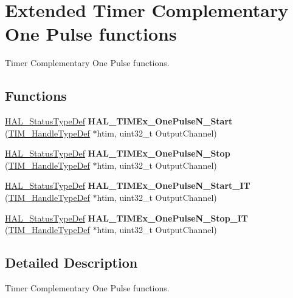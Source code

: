 \hypertarget{group___t_i_m_ex___exported___functions___group4}{}\section{Extended Timer Complementary One Pulse functions}
\label{group___t_i_m_ex___exported___functions___group4}


Timer Complementary One Pulse functions.  


\subsection*{Functions}
\begin{DoxyCompactItemize}
\item 
\mbox{\label{group___t_i_m_ex___exported___functions___group4_ga41e254708b0215a68acb6e0836d4f8ca}} 
\mbox{\hyperlink{stm32f7xx__hal__def_8h_a63c0679d1cb8b8c684fbb0632743478f}{H\+A\+L\+\_\+\+Status\+Type\+Def}} {\bfseries H\+A\+L\+\_\+\+T\+I\+M\+Ex\+\_\+\+One\+Pulse\+N\+\_\+\+Start} (\mbox{\hyperlink{struct_t_i_m___handle_type_def}{T\+I\+M\+\_\+\+Handle\+Type\+Def}} $\ast$htim, uint32\+\_\+t Output\+Channel)
\item 
\mbox{\label{group___t_i_m_ex___exported___functions___group4_gaf42ab805f75ecece735d600e54cabf83}} 
\mbox{\hyperlink{stm32f7xx__hal__def_8h_a63c0679d1cb8b8c684fbb0632743478f}{H\+A\+L\+\_\+\+Status\+Type\+Def}} {\bfseries H\+A\+L\+\_\+\+T\+I\+M\+Ex\+\_\+\+One\+Pulse\+N\+\_\+\+Stop} (\mbox{\hyperlink{struct_t_i_m___handle_type_def}{T\+I\+M\+\_\+\+Handle\+Type\+Def}} $\ast$htim, uint32\+\_\+t Output\+Channel)
\item 
\mbox{\label{group___t_i_m_ex___exported___functions___group4_ga297a97004076cee5734510a0dece7665}} 
\mbox{\hyperlink{stm32f7xx__hal__def_8h_a63c0679d1cb8b8c684fbb0632743478f}{H\+A\+L\+\_\+\+Status\+Type\+Def}} {\bfseries H\+A\+L\+\_\+\+T\+I\+M\+Ex\+\_\+\+One\+Pulse\+N\+\_\+\+Start\+\_\+\+IT} (\mbox{\hyperlink{struct_t_i_m___handle_type_def}{T\+I\+M\+\_\+\+Handle\+Type\+Def}} $\ast$htim, uint32\+\_\+t Output\+Channel)
\item 
\mbox{\label{group___t_i_m_ex___exported___functions___group4_ga5b6f320c18f453054a5409db6b98254e}} 
\mbox{\hyperlink{stm32f7xx__hal__def_8h_a63c0679d1cb8b8c684fbb0632743478f}{H\+A\+L\+\_\+\+Status\+Type\+Def}} {\bfseries H\+A\+L\+\_\+\+T\+I\+M\+Ex\+\_\+\+One\+Pulse\+N\+\_\+\+Stop\+\_\+\+IT} (\mbox{\hyperlink{struct_t_i_m___handle_type_def}{T\+I\+M\+\_\+\+Handle\+Type\+Def}} $\ast$htim, uint32\+\_\+t Output\+Channel)
\end{DoxyCompactItemize}


\subsection{Detailed Description}
Timer Complementary One Pulse functions. 

